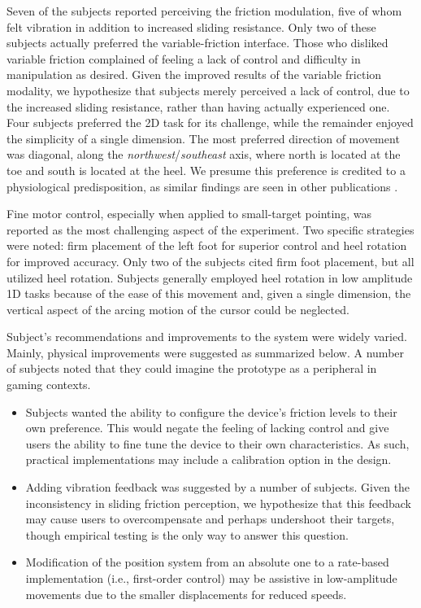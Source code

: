 \documentclass [12pt,letterpaper]{report}
\begin{document}
Seven of the subjects reported perceiving the friction modulation, five of whom felt vibration in addition to increased sliding resistance. Only two of these subjects actually preferred the variable-friction interface. Those who disliked variable friction complained of feeling a lack of control and difficulty in manipulation as desired. Given the improved results of the variable friction modality, we hypothesize that subjects merely perceived a lack of control, due to the increased sliding resistance, rather than having actually experienced one. Four subjects preferred the 2D task for its challenge, while the remainder enjoyed the simplicity of a single dimension. The most preferred direction of movement was diagonal, along the \textit{northwest}/\textit{southeast} axis, where north is located at the toe and south is located at the heel.  We presume this preference is credited to a physiological predisposition, as similar findings are seen in other publications \cite{alexander2012putting}.

Fine motor control, especially when applied to small-target pointing, was reported as the most challenging aspect of the experiment. Two specific strategies were noted: firm placement of the left foot for superior control and heel rotation for improved accuracy. Only two of the subjects cited firm foot placement, but all utilized heel rotation. Subjects generally employed heel rotation in low amplitude 1D tasks because of the ease of this movement and, given a single dimension, the vertical aspect of the arcing motion of the cursor could be neglected.

Subject's recommendations and improvements to the system were widely varied. Mainly, physical improvements were suggested as summarized below. A number of subjects noted that they could imagine the prototype as a peripheral in gaming contexts.

\begin{itemize}
	\item Subjects wanted the ability to configure the device's friction levels to their own preference. This would negate the feeling of lacking control and give users the ability to fine tune the device to their own characteristics. As such, practical implementations may include a calibration option in the design.

	\item Adding vibration feedback was suggested by a number of subjects. Given the inconsistency in sliding friction perception, we hypothesize that this feedback may cause users to overcompensate and perhaps undershoot their targets, though empirical testing is the only way to answer this question.
	
	\item Modification of the position system from an absolute one to a rate-based implementation (i.e., first-order control) may be assistive in low-amplitude movements due to the smaller displacements for reduced speeds.
	
\end{itemize}
\end{document}
